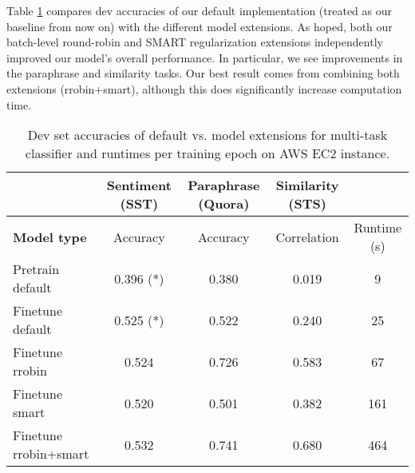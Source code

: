 \documentclass{article}
\begin{document}
Table \ref{tab: multi} compares dev accuracies of our default implementation (treated as our baseline from now on) with the different model extensions. As hoped, both our batch-level round-robin and SMART regularization extensions independently improved our model's overall performance. In particular, we see improvements in the paraphrase and similarity tasks. Our best result comes from combining both extensions (rrobin+smart), although this does significantly increase computation time. 
\begin{table}[h]
\footnotesize
\centering
\begin{tabular}{|l|cccc|} \hline
& \multicolumn{1}{c}{\textbf{Sentiment (SST)}} & \multicolumn{1}{c}{\textbf{Paraphrase (Quora)}} & \multicolumn{1}{c}{\textbf{Similarity (STS)}} &  \\ \hline
\textbf{Model type} & Accuracy & Accuracy & Correlation & Runtime (s) \\ \hline
Pretrain default      & 0.396 (*)         & 0.380            & 0.019 & 9          \\
Finetune default      & 0.525 (*)        & 0.522           & 0.240 &  25         \\
Finetune rrobin       & 0.524            & 0.726            & 0.583   & 67        \\
Finetune smart        & 0.520             & 0.501           & 0.382 & 161          \\
Finetune rrobin+smart & 0.532              & 0.741            & 0.680 & 464          \\ \hline
\end{tabular}
\caption{Dev set accuracies of default vs. model extensions for multi-task classifier and runtimes per training epoch on AWS EC2 instance.}
\label{tab: multi}
\end{table}
\vspace{-0.6cm}

\end{document}
